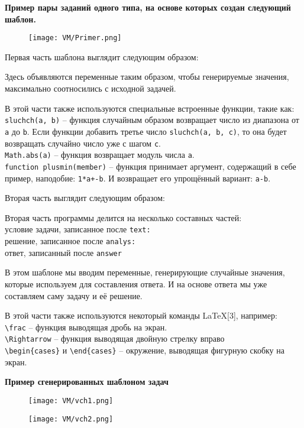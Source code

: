 \textbf{Пример пары заданий одного типа, на основе которых создан следующий шаблон. } 

\begin{figure}[h]
		\centering
		\texttt{[image: VM/Primer.png]}
\label{ris:image}
\end{figure}

Первая часть шаблона выглядит следующим образом:



Здесь объявляются переменные таким образом, чтобы генерируемые значения,  максимально соотносились с исходной задачей.

В этой части также используются специальные встроенные функции, такие как:
\\ \texttt{sluchch(a, b)} – функция случайным образом возвращает число из диапазона от \texttt{a} до \texttt{b}. Если функции добавить третье число \texttt{sluchch(a, b, с)}, то она будет возвращать случайно число уже с шагом \texttt{с}.
\\ \texttt{Math.abs(a)} – функция возвращает модуль числа \texttt{a}.
\\ \texttt{function plusmin(member)} – функция принимает аргумент, содержащий в себе пример, наподобие: \texttt{1*a+-b}. И возвращает его упрощённый вариант: \texttt{a-b}.

Вторая часть выглядит следующим образом:



Вторая часть программы делится на несколько составных частей:
\\ условие задачи, записанное после \texttt{text:}
\\ решение, записанное после \texttt{analys:}
\\ ответ, записанный после \texttt{answer}

В этом шаблоне мы вводим переменные, генерирующие случайные значения, которые используем для составления ответа. И на основе ответа мы уже составляем саму задачу и её решение.

В этой части также используются некоторый команды \LaTeX[3], например:
\\ \texttt{\textbackslash frac} – функция выводящая дробь на экран.
\\ \texttt{\textbackslash Rightarrow} – функция выводящая двойную стрелку вправо
\\ \texttt{\textbackslash begin\{cases\}} и \texttt{\textbackslash end\{cases\}} – окружение, выводящая фигурную скобку на экран.

\textbf{ Пример сгенерированных шаблоном задач}

 	\begin{figure}[h]
		\centering
		\texttt{[image: VM/vch1.png]}
		 		\end{figure}
		 	\begin{figure}[h]
		\centering
		\texttt{[image: VM/vch2.png]}
	\end{figure}
